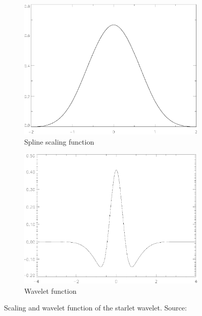 \begin{figure}[h]
	\centering
	\begin{subfigure}[b]{0.4\linewidth}
		\includegraphics[width=\linewidth]{./chapters/05.algorithms/starlets/scaling.png}
		\caption{Spline scaling function}
		\label{cd:starlets:scaling}
	\end{subfigure}
	\begin{subfigure}[b]{0.4\linewidth}
		\includegraphics[width=\linewidth]{./chapters/05.algorithms/starlets/wavelet.png}
		\caption{Wavelet function}
		\label{cd:starlets:wavelet}
	\end{subfigure}
	\caption{Scaling and wavelet function of the starlet wavelet. Source: \cite{starck2015starlet}}
	\label{cd:starlets:figure}
\end{figure}

